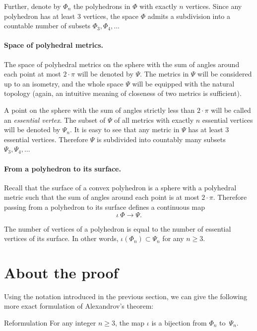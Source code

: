 Further, denote by $\Phi_n$ the polyhedrons in $\Phi$ with exactly $n$ vertices.
Since any polyhedron has at least 3 vertices, the space $\Phi$ admits a subdivision into a countable number of subsets $\Phi_3,\Phi_4,\dots$

\paragraph{Space of polyhedral metrics.}
The space of polyhedral metrics on the sphere with the sum of angles around each point at most $2\cdot\pi$ will be denoted by $\Psi$.
The metrics in $\Psi$ will be considered up to an isometry, and the whole space $\Psi$ will be equipped with the natural topology (again, an intuitive meaning of closeness of two metrics is sufficient).

A point on the sphere with the sum of angles strictly less than $2\cdot\pi$ will be called an \emph{essential vertex}.
The subset of $\Psi$ of all metrics with exactly $n$ essential vertices will be denoted by $\Psi_n$.
It is easy to see that any metric in $\Psi$ has at least 3 essential vertices.
Therefore $\Psi$ is subdivided into countably many subsets
 $\Psi_3,\Psi_4,\dots$

\paragraph{From a polyhedron to its surface.}

Recall that the surface of a convex polyhedron is a sphere with a polyhedral metric such that the sum of angles around each point is at most $2\cdot\pi$.
Therefore passing from a polyhedron to its surface defines a continuous map
\[\iota\:\Phi\to \Psi.\]

The number of vertices of a polyhedron is equal to the number of essential vertices of its surface.
In other words, $\iota(\Phi_n)\subset \Psi_n$ for any $n\ge 3$.

\section{About the proof}

Using the notation introduced in the previous section, we can give the following more exact formulation of Alexandrov's theorem: 

\begin{thm}{Reformulation}
For any integer $n\ge 3$,
the map $\iota$ is a bijection from $\Phi_n$ to~$\Psi_n$.
\end{thm}

